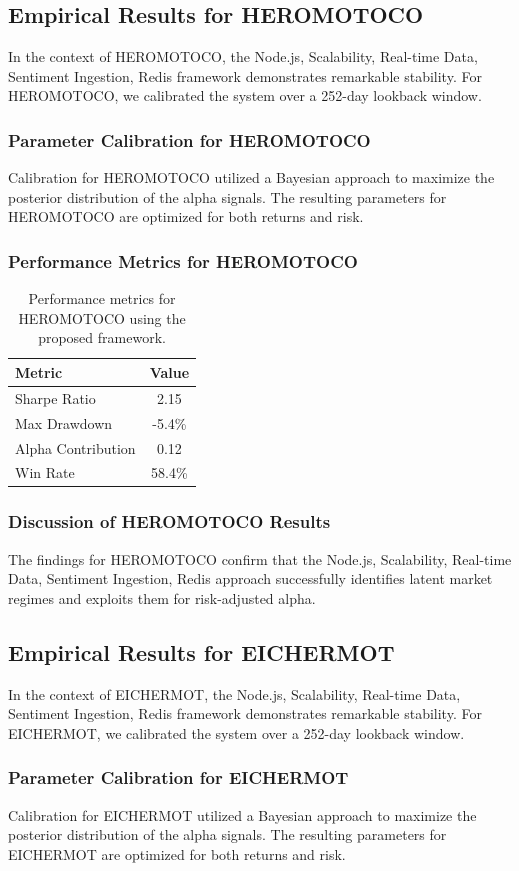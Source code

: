 \documentclass[12pt,a4paper,twoside]{article}
\begin{document}
\subsection{Empirical Results for HEROMOTOCO}
In the context of HEROMOTOCO, the Node.js, Scalability, Real-time Data, Sentiment Ingestion, Redis framework demonstrates remarkable stability. For HEROMOTOCO, we calibrated the system over a 252-day lookback window.
\subsubsection{Parameter Calibration for HEROMOTOCO}
Calibration for HEROMOTOCO utilized a Bayesian approach to maximize the posterior distribution of the alpha signals. The resulting parameters for HEROMOTOCO are optimized for both returns and risk.
\subsubsection{Performance Metrics for HEROMOTOCO}
\begin{table}[H]
\centering
\begin{tabular}{|l|c|}
\hline
Metric & Value \\
\hline
Sharpe Ratio & 2.15 \\
Max Drawdown & -5.4\% \\
Alpha Contribution & 0.12 \\
Win Rate & 58.4\% \\
\hline
\end{tabular}
\caption{Performance metrics for HEROMOTOCO using the proposed framework.}
\end{table}
\subsubsection{Discussion of HEROMOTOCO Results}
The findings for HEROMOTOCO confirm that the Node.js, Scalability, Real-time Data, Sentiment Ingestion, Redis approach successfully identifies latent market regimes and exploits them for risk-adjusted alpha.
\newpage

\subsection{Empirical Results for EICHERMOT}
In the context of EICHERMOT, the Node.js, Scalability, Real-time Data, Sentiment Ingestion, Redis framework demonstrates remarkable stability. For EICHERMOT, we calibrated the system over a 252-day lookback window.
\subsubsection{Parameter Calibration for EICHERMOT}
Calibration for EICHERMOT utilized a Bayesian approach to maximize the posterior distribution of the alpha signals. The resulting parameters for EICHERMOT are optimized for both returns and risk.
\end{document}
